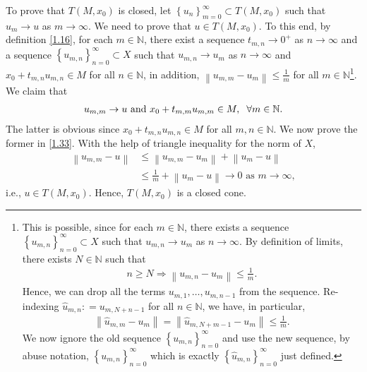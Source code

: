 \documentclass[a4paper]{article}
\numberwithin{equation}{section}
\begin{document}
\begin{enumerate}
To prove that $T\left(M,x_0\right)$ is closed, let $\left\{ {{u_n}} \right\}_{m = 0}^\infty  \subset T\left( {M,{x_0}} \right)$ such that $u_m \to u$ as $m\to \infty$. We need to prove that $u\in T\left(M,x_0\right)$. To this end, by definition \eqref{1.16}, for each $m\in \mathbb{N}$, there exist a sequence $t_{m,n} \to 0^+$ as $n\to \infty$ and a sequence $\left\{ {{u_{m,n}}} \right\}_{n = 0}^\infty  \subset X$ such that $u_{m,n}\to u_m$ as $n\to \infty$ and $x_0+t_{m,n}u_{m,n} \in M$ for all $n\in \mathbb{N}$, in addition, $\left\| {{u_{m,m}} - {u_m}} \right\| \le \frac{1}{m}$ for all $m\in \mathbb{N}$\footnote{This is possible, since for each $m\in \mathbb{N}$, there exists a sequence $\left\{ {{u_{m,n}}} \right\}_{n = 0}^\infty  \subset X$ such that $u_{m,n}\to u_m$ as $n\to \infty$. By definition of limits, there exists $N\in \mathbb{N}$ such that 
\begin{align}
n \ge N \Rightarrow \left\| {{u_{m,n}} - {u_m}} \right\| \le \frac{1}{m}.
\end{align}
Hence, we can drop all the terms $u_{m,1},\ldots,u_{m,n-1}$ from the sequence. Re-indexing ${\widehat u_{m,n}}: = {u_{m,N + n - 1}}$ for all $n\in \mathbb{N}$, we have, in particular, 
\begin{align}
\left\| {{{\widehat u}_{m,m}} - {u_m}} \right\| = \left\| {{{\widehat u}_{m,N + m - 1}} - {u_m}} \right\| \le \frac{1}{m}.
\end{align}
We now ignore the old sequence $\left\{ {{u_{m,n}}} \right\}_{n = 0}^\infty $ and use the new sequence, by abuse notation, $\left\{ {{u_{m,n}}} \right\}_{n = 0}^\infty $ which is exactly $\left\{ {{{\widehat u}_{m,n}}} \right\}_{n = 0}^\infty $ just defined.}. We claim that
\begin{align}
\label{1.33}
{u_{m,m}} \to u \mbox{ and } {x_0} + {t_{m,m}}{u_{m,m}} \in M,\hspace{0.2cm}\forall m \in \mathbb{N}.
\end{align} 
The latter is obvious since ${x_0} + {t_{m,n}}{u_{m,n}} \in M$ for all $m,n \in \mathbb{N}$. We now prove the former in \eqref{1.33}. With the help of triangle inequality for the norm of $X$, 
\begin{align}
\left\| {{u_{m,m}} - u} \right\| &\le \left\| {{u_{m,m}} - {u_m}} \right\| + \left\| {{u_m} - u} \right\|\\
& \le \frac{1}{m} + \left\| {{u_m} - u} \right\| \to 0\mbox{ as } m \to \infty ,
\end{align}
i.e., $u\in T\left(M,x_0\right)$. Hence, $T\left(M,x_0\right)$ is a closed cone. 

\end{enumerate}
\end{document}
